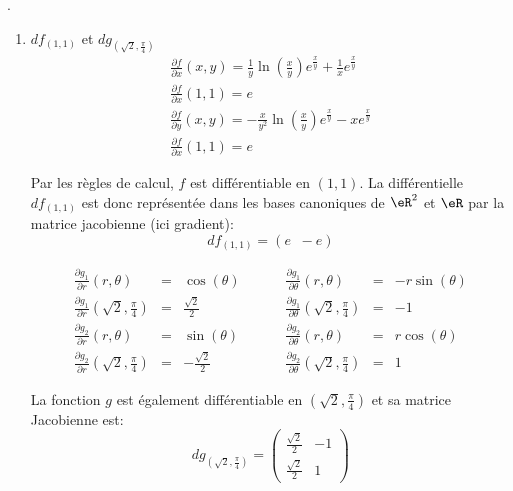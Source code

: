 .
\begin{enumerate}
	\item $df_{(1,1)}$ et $dg_{(\sqrt2,\frac{\pi}{4})}$\\
	      \[\begin{array}{l}\frac{ \partial f }{ \partial x }(x,y) = \frac{1}{y}\ln(\frac{x}{y})e^{\frac{x}{y}}+\frac{1}{x}e^{\frac{x}{y}} \\
			      \frac{ \partial f }{ \partial x }(1,1)=e                                                                          \\
			      \frac{ \partial f }{ \partial y }(x,y)=-\frac{x}{y^2}\ln(\frac{x}{y})e^{\frac{x}{y}}-xe^{\frac{x}{y}}             \\
			      \frac{ \partial f }{ \partial x }(1,1)=e\end{array}\]

	      \noindent Par les règles de calcul, $f$ est différentiable en $(1,1)$. La différentielle $df_{(1,1)}$ est donc représentée dans les bases canoniques de $\eR^2$ et $\eR$ par la matrice jacobienne (ici gradient):\[df_{(1,1)}=(e \;\; -e)\]

	      \[\begin{array}{lclllllcl}\frac{ \partial g_1 }{ \partial r }(r,\theta)   & = & \cos(\theta)      &  &  &  & \frac{ \partial g_1 }{ \partial \theta }(r,\theta)              & = & -r\sin(\theta) \\
             \frac{ \partial g_1 }{ \partial r }(\sqrt2, \frac{\pi}{4}) & = & \frac{\sqrt2}{2}  &  &  &  & \frac{ \partial g_1 }{ \partial \theta }(\sqrt2, \frac{\pi}{4}) & = & -1             \\
             \frac{ \partial g_2 }{ \partial r }(r,\theta)              & = & \sin(\theta)      &  &  &  & \frac{ \partial g_2 }{ \partial \theta }(r,\theta)              & = & r\cos(\theta)  \\
             \frac{ \partial g_2 }{ \partial r }(\sqrt2, \frac{\pi}{4}) & = & -\frac{\sqrt2}{2} &  &  &  & \frac{ \partial g_2 }{ \partial \theta }(\sqrt2, \frac{\pi}{4}) & = & 1\end{array}\]

	      La fonction $g$ est également différentiable en $(\sqrt2, \frac{\pi}{4})$ et sa matrice Jacobienne est:
	      \[dg_{(\sqrt2, \frac{\pi}{4})}=\left(\begin{array}{cc} \frac{\sqrt2}{2} & -1 \\
             \frac{\sqrt2}{2}      & 1\end{array}\right)\]



\end{enumerate}
